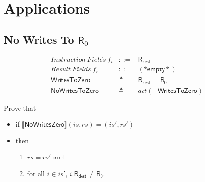 \documentclass[12pt, letterpaper]{article}
\begin{document}
\section{Applications}

\subsection{No Writes To $\mathsf{R}_0$}

\[
\begin{array}{rcl}
  \mathit{Instruction\ Fields}\ f_i &::=& \mathsf{R}_{\mathsf{dest}} \\
  \mathit{Result\ Fields}\ f_r &::=& \mathsf{(*empty*)}\\
  \mathsf{WritesToZero} &\triangleq& \mathsf{R}_{\mathsf{dest}} = \mathsf{R}_0 \\
  \mathsf{NoWritesToZero} &\triangleq& \mathit{act}(\neg\mathsf{WritesToZero})
\end{array}
\]

Prove that
\begin{itemize}
\item  if
  $\llbracket \mathsf{NoWritesZero} \rrbracket (\mathit{is}, \mathit{rs}) =
  (\mathit{is}', \mathit{rs}')$
\item then
  \begin{enumerate}
  \item $\mathit{rs} = \mathit{rs'}$ and
  \item for all $i \in \mathit{is}'$, $i.\mathsf{R}_{\mathsf{dest}} \neq \mathsf{R}_0$.
  \end{enumerate}
\end{itemize}
\end{document}
